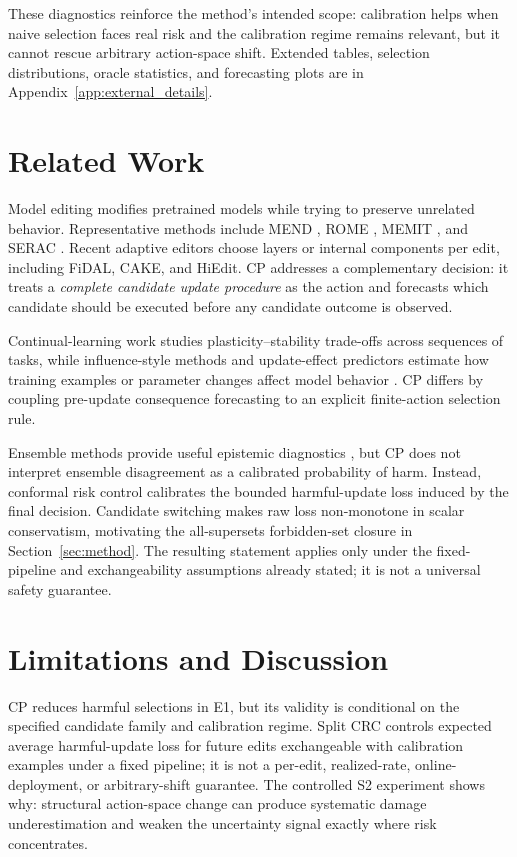 \documentclass{article} %
\begin{document}
These diagnostics reinforce the method's intended scope: calibration helps
when naive selection faces real risk and the calibration regime remains
relevant, but it cannot rescue arbitrary action-space shift. Extended tables,
selection distributions, oracle statistics, and forecasting plots are in
Appendix~\ref{app:external_details}.

\section{Related Work}
\label{sec:related_work}

Model editing modifies pretrained models while trying to preserve unrelated
behavior. Representative methods include MEND \citep{mitchell2022mend}, ROME
\citep{meng2022rome}, MEMIT \citep{meng2023memit}, and SERAC
\citep{mitchell2022serac}. Recent adaptive editors choose layers or internal
components per edit, including FiDAL, CAKE, and HiEdit. CP addresses a
complementary decision: it treats a \emph{complete candidate update procedure}
as the action and forecasts which candidate should be executed before any
candidate outcome is observed.

Continual-learning work studies plasticity--stability trade-offs across
sequences of tasks, while influence-style methods and update-effect predictors
estimate how training examples or parameter changes affect model behavior
\citep{koh2017understanding}. CP differs by coupling pre-update consequence
forecasting to an explicit finite-action selection rule.

Ensemble methods provide useful epistemic diagnostics
\citep{lakshminarayanan2017deep}, but CP does not interpret ensemble
disagreement as a calibrated probability of harm. Instead, conformal risk
control \citep{angelopoulos2024conformal} calibrates the bounded harmful-update
loss induced by the final decision. Candidate switching makes raw loss
non-monotone in scalar conservatism, motivating the all-supersets forbidden-set
closure in Section~\ref{sec:method}. The resulting statement applies only
under the fixed-pipeline and exchangeability assumptions already stated; it is
not a universal safety guarantee.

\section{Limitations and Discussion}
\label{sec:limitations}

CP reduces harmful selections in E1, but its validity is conditional on the
specified candidate family and calibration regime. Split CRC controls expected
average harmful-update loss for future edits exchangeable with calibration
examples under a fixed pipeline; it is not a per-edit, realized-rate,
online-deployment, or arbitrary-shift guarantee. The controlled S2 experiment
shows why: structural action-space change can produce systematic damage
underestimation and weaken the uncertainty signal exactly where risk
concentrates.
\end{document}
